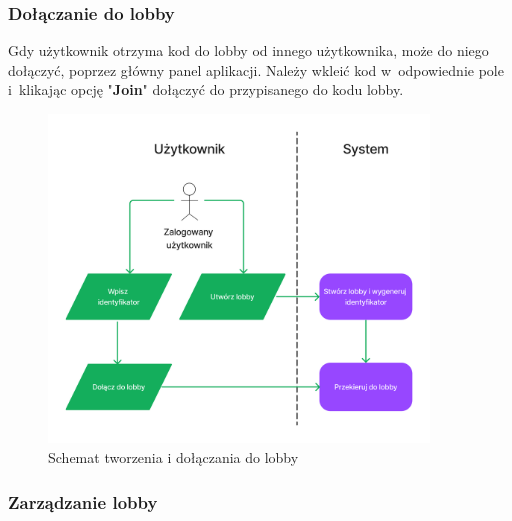 \subsubsection{Dołączanie do lobby}

Gdy użytkownik otrzyma kod do lobby od innego użytkownika, może
do niego dołączyć, poprzez główny panel aplikacji. Należy wkleić
kod w~odpowiednie pole i~klikając opcję "\textbf{Join}"\xspace
dołączyć do przypisanego do kodu lobby.

\begin{figure}[hbt!]
    \centering
    \includegraphics[width=0.9\textwidth]{img/schematy/create_join_lobby.png}
    \caption{Schemat tworzenia i dołączania do lobby}
\end{figure}

\FloatBarrier


\subsubsection{Zarządzanie lobby}

